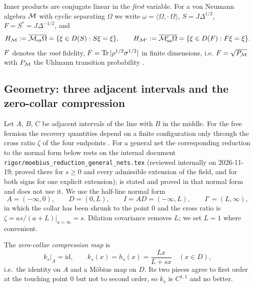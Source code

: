 Inner products are conjugate linear in the \emph{first} variable.  For a von Neumann algebra $\mathcal M$ with
cyclic separating $\Omega$ we write $\omega=\langle\Omega,\cdot\,\Omega\rangle$, $S=J\Delta^{1/2}$,
$F=S^*=J\Delta^{-1/2}$, and
\begin{equation}\label{eq:realsub}
 H_{\mathcal M}:=\overline{\mathcal M_{\rm sa}\Omega}=\{\xi\in D(S):S\xi=\xi\},\qquad
 H_{\mathcal M'}:=\overline{\mathcal M'_{\rm sa}\Omega}=\{\xi\in D(F):F\xi=\xi\}.
\end{equation}
$F$ denotes the \emph{root} fidelity, $F=\operatorname{Tr}|\rho^{1/2}\sigma^{1/2}|$ in finite dimensions, i.e.
$F=\sqrt{P_{\mathcal M}}$ with $P_{\mathcal M}$ the Uhlmann transition probability \cite{AU02}.

\subsection{Geometry: three adjacent intervals and the zero-collar compression}\label{ss:geom}

Let $A$, $B$, $C$ be adjacent intervals of the line with $B$ in the middle.  For the free fermion the recovery
quantities depend on a finite configuration only through the cross ratio $\zeta$ of the four endpoints
\cite[Lemma 1.1]{Note5}.  For a general net the corresponding reduction to the normal form below rests on
the internal document \texttt{rigor/moebius\_reduction\_general\_nets.tex} (reviewed internally on 2026-11-19; proved there for $s\ge0$ and every admissible extension of the field, and for both signs for one explicit extension);  is
stated and proved in that normal form and does not use it.  We use the half-line normal form
\begin{equation}\label{eq:geom}
 A=(-\infty,0),\qquad D=(0,L),\qquad I=AD=(-\infty,L),\qquad I'=(L,\infty),
\end{equation}
in which the collar has been shrunk to the point $0$ and the cross ratio is $\zeta=as/(a+L)\big|_{a=\infty}=s$.
Dilation covariance removes $L$; we set $L=1$ where convenient.

The \emph{zero-collar compression map} is
\begin{equation}\label{eq:ks}
 k_s|_A=\mathrm{id},\qquad k_s(x)=h_s(x)=\frac{Lx}{L+sx}\quad(x\in D),
\end{equation}
i.e.\ the identity on $A$ and a M\"obius map on $D$.  Its two pieces agree to first order at the touching
point $0$ but not to second order, so $k_s$ is $C^{1,1}$ and no better.


